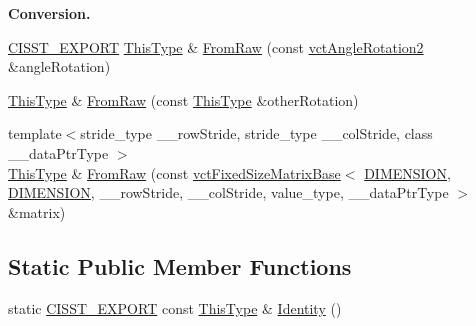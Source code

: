 \begin{Indent}{\bf Conversion.}
\begin{DoxyCompactItemize}
\item 
\hyperlink{cmn_export_macros_8h_a99393e0c3ac434b2605235bbe20684f8}{C\+I\+S\+S\+T\+\_\+\+E\+X\+P\+O\+R\+T} \hyperlink{classvct_matrix_rotation2_base_a47ffeef2ddecede4b16bcc88fb432ff5}{This\+Type} \& \hyperlink{classvct_matrix_rotation2_base_addfc34ad79a9503f6984c8c764aaad91}{From\+Raw} (const \hyperlink{classvct_angle_rotation2}{vct\+Angle\+Rotation2} \&angle\+Rotation)
\item 
\hyperlink{classvct_matrix_rotation2_base_a47ffeef2ddecede4b16bcc88fb432ff5}{This\+Type} \& \hyperlink{classvct_matrix_rotation2_base_ab24150ad52091b8bd75d440c43081dd7}{From\+Raw} (const \hyperlink{classvct_matrix_rotation2_base_a47ffeef2ddecede4b16bcc88fb432ff5}{This\+Type} \&other\+Rotation)
\item 
{\footnotesize template$<$stride\+\_\+type \+\_\+\+\_\+row\+Stride, stride\+\_\+type \+\_\+\+\_\+col\+Stride, class \+\_\+\+\_\+data\+Ptr\+Type $>$ }\\\hyperlink{classvct_matrix_rotation2_base_a47ffeef2ddecede4b16bcc88fb432ff5}{This\+Type} \& \hyperlink{classvct_matrix_rotation2_base_a6b853f8c82b91e33ec94dbd29b46d513}{From\+Raw} (const \hyperlink{classvct_fixed_size_matrix_base}{vct\+Fixed\+Size\+Matrix\+Base}$<$ \hyperlink{classvct_matrix_rotation2_base_ac10279ed12ec787b1a4833ea02771348acefb9855f54f0cfd782e785c9083e592}{D\+I\+M\+E\+N\+S\+I\+O\+N}, \hyperlink{classvct_matrix_rotation2_base_ac10279ed12ec787b1a4833ea02771348acefb9855f54f0cfd782e785c9083e592}{D\+I\+M\+E\+N\+S\+I\+O\+N}, \+\_\+\+\_\+row\+Stride, \+\_\+\+\_\+col\+Stride, value\+\_\+type, \+\_\+\+\_\+data\+Ptr\+Type $>$ \&matrix)
\end{DoxyCompactItemize}
\end{Indent}
\subsection*{Static Public Member Functions}
\begin{DoxyCompactItemize}
\item 
static \hyperlink{cmn_export_macros_8h_a99393e0c3ac434b2605235bbe20684f8}{C\+I\+S\+S\+T\+\_\+\+E\+X\+P\+O\+R\+T} const \hyperlink{classvct_matrix_rotation2_base_a47ffeef2ddecede4b16bcc88fb432ff5}{This\+Type} \& \hyperlink{classvct_matrix_rotation2_base_a83a8b1301a602f4aeef176c02d89e61e}{Identity} ()
\end{DoxyCompactItemize}
